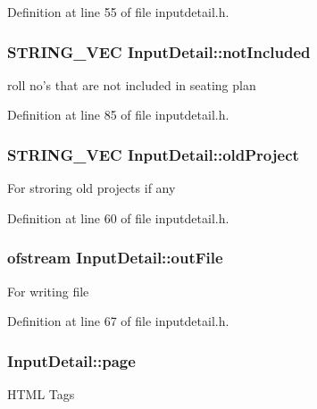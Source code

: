 \-Definition at line 55 of file inputdetail.\-h.

\hypertarget{classInputDetail_aba862d64d7f84a385e528d0daf42e9fc}{
\subsubsection[{not\-Included}]{\setlength{\rightskip}{0pt plus 5cm}\-S\-T\-R\-I\-N\-G\-\_\-\-V\-E\-C {\bf \-Input\-Detail\-::not\-Included}}}\label{classInputDetail_aba862d64d7f84a385e528d0daf42e9fc}
roll no's that are not included in seating plan 

\-Definition at line 85 of file inputdetail.\-h.

\hypertarget{classInputDetail_ae8ccc2e838c6d5a93ea544370dc1f272}{
\subsubsection[{old\-Project}]{\setlength{\rightskip}{0pt plus 5cm}\-S\-T\-R\-I\-N\-G\-\_\-\-V\-E\-C {\bf \-Input\-Detail\-::old\-Project}}}\label{classInputDetail_ae8ccc2e838c6d5a93ea544370dc1f272}
\-For stroring old projects if any 

\-Definition at line 60 of file inputdetail.\-h.

\hypertarget{classInputDetail_a2b8484cfbfee98ae69e8476f8fd40000}{
\subsubsection[{out\-File}]{\setlength{\rightskip}{0pt plus 5cm}ofstream {\bf \-Input\-Detail\-::out\-File}}}\label{classInputDetail_a2b8484cfbfee98ae69e8476f8fd40000}
\-For writing file 

\-Definition at line 67 of file inputdetail.\-h.

\hypertarget{classInputDetail_ae487757aaafba4ac372c327e2b7a9673}{
\subsubsection[{page}]{ {\bf \-Input\-Detail\-::page}}}\label{classInputDetail_ae487757aaafba4ac372c327e2b7a9673}
\-H\-T\-M\-L \-Tags 

